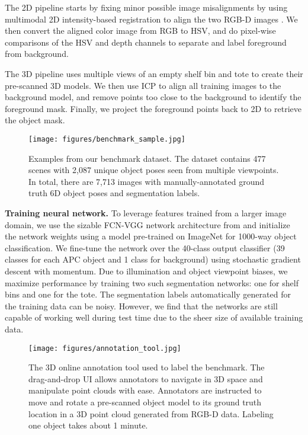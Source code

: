 \documentclass[letterpaper, 10 pt, conference]{ieeeconf}  %
\newcommand{\myparagraph}[1]{\vspace{0.1in}\noindent\textbf{#1}}
\begin{document}
The 2D pipeline starts by fixing minor possible image misalignments by using multimodal 2D intensity-based registration to align the two RGB-D images \cite{styner2000parametric}. We then convert the aligned color image from RGB to HSV, and do pixel-wise comparisons of the HSV and depth channels to separate and label foreground from background.

The 3D pipeline uses multiple views of an empty shelf bin and tote to create their pre-scanned 3D models. We then use ICP to align all training images to the background model, and remove points too close to the background to identify the foreground mask. Finally, we project the foreground points back to 2D to retrieve the object mask.

\begin{figure}[t]
\vspace{2mm}
\centering
  \texttt{[image: figures/benchmark\_sample.jpg]}
  \caption{Examples from our benchmark dataset. The dataset contains 477 scenes with 2,087 unique object poses seen from multiple viewpoints. In total, there are 7,713 images with manually-annotated ground truth 6D object poses and segmentation labels.}
\label{fig:benchmark}
\vspace{-5mm}
\end{figure}


\myparagraph{Training neural network.} To leverage features trained from a larger image domain, we use the sizable FCN-VGG network architecture from \cite{simonyan2014very} and initialize the network weights using a model pre-trained on ImageNet for 1000-way object classification. We fine-tune the network over the 40-class output classifier (39 classes for each APC object and 1 class for background) using stochastic gradient descent with momentum. Due to illumination and object viewpoint biases, we maximize performance by training two such segmentation networks: one for shelf bins and one for the tote. The segmentation labels automatically generated for the training data can be noisy. However, we find that the networks are still capable of working well during test time due to the sheer size of available training data.

\begin{figure}[t]
\vspace{2mm}
\centering
  \texttt{[image: figures/annotation\_tool.jpg]}
  \caption{The 3D online annotation tool used to label the benchmark. The drag-and-drop UI allows annotators to navigate in 3D space and manipulate point clouds with ease. Annotators are instructed to move and rotate a pre-scanned object model to its ground truth location in a 3D point cloud generated from RGB-D data. Labeling one object takes about 1 minute.}
  \label{fig:tool}
  \vspace{-5mm}
\end{figure}
\end{document}
